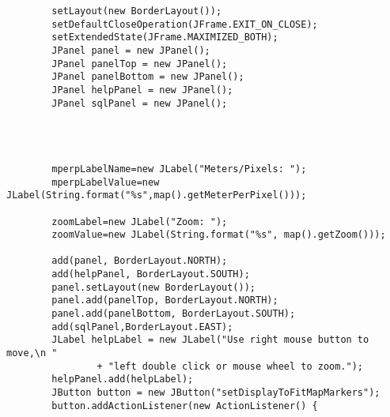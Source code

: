\begin{verbatim}
        setLayout(new BorderLayout());
        setDefaultCloseOperation(JFrame.EXIT_ON_CLOSE);
        setExtendedState(JFrame.MAXIMIZED_BOTH);
        JPanel panel = new JPanel();
        JPanel panelTop = new JPanel();
        JPanel panelBottom = new JPanel();
        JPanel helpPanel = new JPanel();
        JPanel sqlPanel = new JPanel();




        mperpLabelName=new JLabel("Meters/Pixels: ");
        mperpLabelValue=new JLabel(String.format("%s",map().getMeterPerPixel()));

        zoomLabel=new JLabel("Zoom: ");
        zoomValue=new JLabel(String.format("%s", map().getZoom()));

        add(panel, BorderLayout.NORTH);
        add(helpPanel, BorderLayout.SOUTH);
        panel.setLayout(new BorderLayout());
        panel.add(panelTop, BorderLayout.NORTH);
        panel.add(panelBottom, BorderLayout.SOUTH);
        add(sqlPanel,BorderLayout.EAST);
        JLabel helpLabel = new JLabel("Use right mouse button to move,\n "
                + "left double click or mouse wheel to zoom.");
        helpPanel.add(helpLabel);
        JButton button = new JButton("setDisplayToFitMapMarkers");
        button.addActionListener(new ActionListener() {


\end{verbatim}
